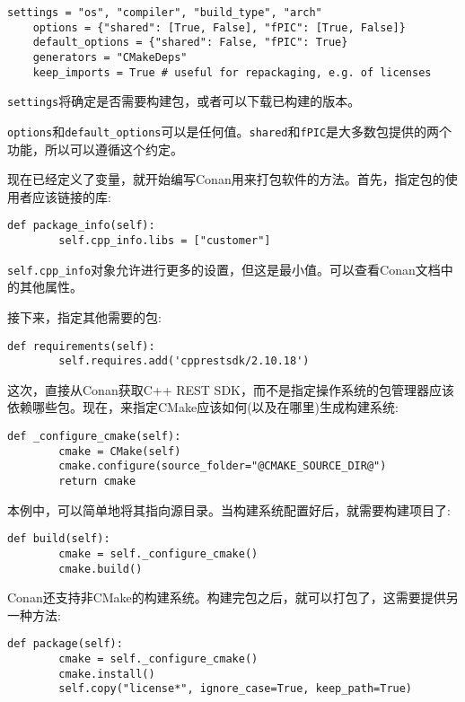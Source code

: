 \begin{lstlisting}[style=stylePython]
	settings = "os", "compiler", "build_type", "arch"
	options = {"shared": [True, False], "fPIC": [True, False]}
	default_options = {"shared": False, "fPIC": True}
	generators = "CMakeDeps"
	keep_imports = True # useful for repackaging, e.g. of licenses
\end{lstlisting}

\texttt{settings}将确定是否需要构建包，或者可以下载已构建的版本。

\texttt{options}和\texttt{default\_options}可以是任何值。\texttt{shared}和\texttt{fPIC}是大多数包提供的两个功能，所以可以遵循这个约定。

现在已经定义了变量，就开始编写Conan用来打包软件的方法。首先，指定包的使用者应该链接的库:

\begin{lstlisting}[style=stylePython]
	def package_info(self):
		self.cpp_info.libs = ["customer"]
\end{lstlisting}

\texttt{self.cpp\_info}对象允许进行更多的设置，但这是最小值。可以查看Conan文档中的其他属性。

接下来，指定其他需要的包:

\begin{lstlisting}[style=stylePython]
	def requirements(self):
		self.requires.add('cpprestsdk/2.10.18')
\end{lstlisting}

这次，直接从Conan获取C++ REST SDK，而不是指定操作系统的包管理器应该依赖哪些包。现在，来指定CMake应该如何(以及在哪里)生成构建系统:

\begin{lstlisting}[style=stylePython]
	def _configure_cmake(self):
		cmake = CMake(self)
		cmake.configure(source_folder="@CMAKE_SOURCE_DIR@")
		return cmake
\end{lstlisting}

本例中，可以简单地将其指向源目录。当构建系统配置好后，就需要构建项目了:

\begin{lstlisting}[style=stylePython]
	def build(self):
		cmake = self._configure_cmake()
		cmake.build()
\end{lstlisting}

Conan还支持非CMake的构建系统。构建完包之后，就可以打包了，这需要提供另一种方法:

\begin{lstlisting}[style=stylePython]
	def package(self):
		cmake = self._configure_cmake()
		cmake.install()
		self.copy("license*", ignore_case=True, keep_path=True)
\end{lstlisting}

